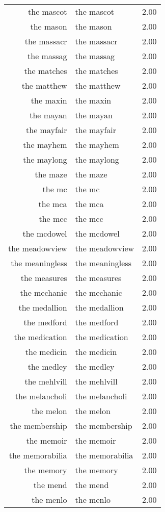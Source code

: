 \begin{table}[ht]
\begin{tabular}{rlr}
  the mascot & the mascot & 2.00 \\ 
  the mason & the mason & 2.00 \\ 
  the massacr & the massacr & 2.00 \\ 
  the massag & the massag & 2.00 \\ 
  the matches & the matches & 2.00 \\ 
  the matthew & the matthew & 2.00 \\ 
  the maxin & the maxin & 2.00 \\ 
  the mayan & the mayan & 2.00 \\ 
  the mayfair & the mayfair & 2.00 \\ 
  the mayhem & the mayhem & 2.00 \\ 
  the maylong & the maylong & 2.00 \\ 
  the maze & the maze & 2.00 \\ 
  the mc & the mc & 2.00 \\ 
  the mca & the mca & 2.00 \\ 
  the mcc & the mcc & 2.00 \\ 
  the mcdowel & the mcdowel & 2.00 \\ 
  the meadowview & the meadowview & 2.00 \\ 
  the meaningless & the meaningless & 2.00 \\ 
  the measures & the measures & 2.00 \\ 
  the mechanic & the mechanic & 2.00 \\ 
  the medallion & the medallion & 2.00 \\ 
  the medford & the medford & 2.00 \\ 
  the medication & the medication & 2.00 \\ 
  the medicin & the medicin & 2.00 \\ 
  the medley & the medley & 2.00 \\ 
  the mehlvill & the mehlvill & 2.00 \\ 
  the melancholi & the melancholi & 2.00 \\ 
  the melon & the melon & 2.00 \\ 
  the membership & the membership & 2.00 \\ 
  the memoir & the memoir & 2.00 \\ 
  the memorabilia & the memorabilia & 2.00 \\ 
  the memory & the memory & 2.00 \\ 
  the mend & the mend & 2.00 \\ 
  the menlo & the menlo & 2.00 \\ 

\end{tabular}
\end{table}
